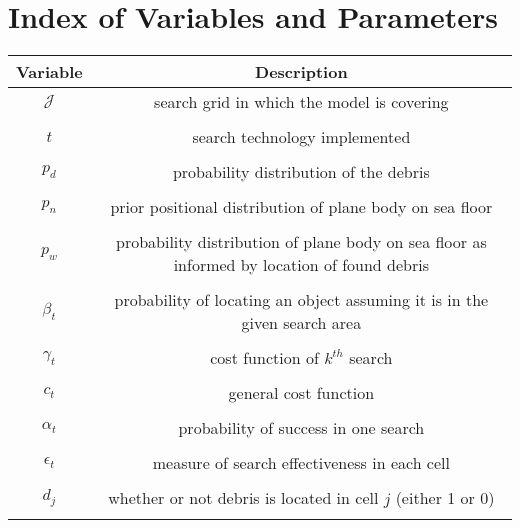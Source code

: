 \section{Index of Variables and Parameters}
\begin{tabular}{|c|c|}
\hline
\textbf{Variable} & \textbf{Description}\\
\hline\hline
$\mathcal{J}$ & search grid in which the model is covering \\\\ \hline 
$t$ & search technology implemented\\\\ \hline
$p_d$ & probability distribution of the debris \\\\ \hline
$p_n$ & prior positional distribution of plane body on sea floor  \\\\ \hline
$p_w$ & probability distribution of plane body on sea floor as informed by location of found debris \\\\ \hline
$\beta_t$ & probability of locating an object assuming it is in the given search area \\\\ \hline
$\gamma_t$ & cost function of $k^{th}$ search \\\\ \hline
$c_t$ & general cost function \\\\ \hline
$\alpha_t$ & probability of success in one search  \\\\ \hline
$\epsilon_t$ & measure of search effectiveness in each cell \\\\ \hline
$d_j$ & whether or not debris is located in cell $j$ (either 1 or 0) \\\\ \hline


\hline\hline     
\end{tabular}

